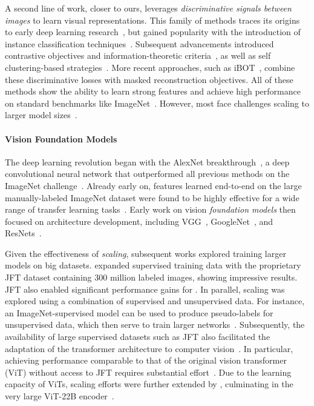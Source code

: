 A second line of work, closer to ours, leverages \emph{discriminative signals between images} to learn visual representations. 
This family of methods traces its origins to early deep learning research~\citep{hadsell2006dimensionality}, but gained popularity with the introduction of instance classification techniques~\citep{dosovitskiy2016discriminative, bojanowski2017unsupervised, wu2018unsupervised}.
Subsequent advancements introduced contrastive objectives and information-theoretic criteria~\citep{henaff2019data,he2020momentum, chen2020exploring, chen2020simple,grill2020bootstrap, bardes2021vicreg}, as well as self clustering-based strategies~\citep{caron2018deep,asano2019self,caron2020unsupervised,caron2021emerging}.
More recent approaches, such as iBOT~\citep{zhou2021ibot}, combine these discriminative losses with masked reconstruction objectives.
All of these methods show the ability to learn strong features and achieve high performance on standard benchmarks like ImageNet~\citep{russakovsky2015imagenet}.
However, most face challenges scaling to larger model sizes~\citep{chen2021empirical}.

\paragraph{Vision Foundation Models}
The deep learning revolution began with the AlexNet breakthrough~\citep{krizhevsky2012imagenet}, a deep convolutional neural network that outperformed all previous methods on the ImageNet challenge~\citep{deng2009imagenet,russakovsky2015imagenet}. 
Already early on, features learned end-to-end on the large manually-labeled ImageNet dataset were found to be highly effective for a wide range of transfer learning tasks~\citep{oquab2014learning}.
Early work on vision \emph{foundation models} then focused on architecture development, including VGG~\citep{simonyan2015very}, GoogleNet~\citep{szegedy2015going}, and ResNets~\citep{he2016deep}. %

Given the effectiveness of \emph{scaling}, subsequent works explored training larger models on big datasets.
\citet{sun2017revisiting} expanded supervised training data with the proprietary JFT dataset containing 300 million labeled images, showing impressive results.
JFT also enabled significant performance gains for \citet{kolesnikov2020big}.
In parallel, scaling was explored using a combination of supervised and unsupervised data. 
For instance, an ImageNet-supervised model can be used to produce pseudo-labels for unsupervised data, which then serve to train larger networks~\citep{yalniz2019billion}.
Subsequently, the availability of large supervised datasets such as JFT also facilitated the adaptation of the transformer architecture to computer vision~\citep{dosovitskiy2020image}.
In particular, achieving performance comparable to that of the original vision transformer (ViT) without access to JFT requires substantial effort~\citep{touvron2020training, touvron2022deit}. 
Due to the learning capacity of ViTs, scaling efforts were further extended by \citet{zhai2022scaling}, culminating in the very large ViT-22B encoder~\citep{dehghani2023scaling}.


